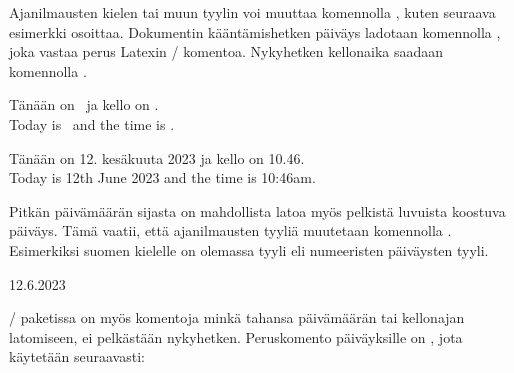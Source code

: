 \begin{koodilohkosis}
\usepackage[finnish, en-GB, showseconds=false]{datetime2}
\end{koodilohkosis}

\noindent
Ajanilmausten kielen tai muun tyylin voi muuttaa komennolla
, kuten seuraava esimerkki osoittaa. Dokumentin
kääntämishetken päiväys ladotaan komennolla , joka
vastaa perus Latexin \-/ komentoa. Nykyhetken kellonaika
saadaan komennolla .

\begin{koodilohkosis}
Tänään on \DTMtoday\ ja kello on \DTMcurrenttime. \\
Today is \DTMtoday\ and the time is \DTMcurrenttime.
\end{koodilohkosis}

\begin{tulossis}
  Tänään on 12. kesäkuuta 2023 ja kello on 10.46. \\
  Today is 12th June 2023 and the time is 10:46am.
\end{tulossis}

\noindent
Pitkän päivämäärän sijasta on mahdollista latoa myös pelkistä luvuista
koostuva päiväys. Tämä vaatii, että ajanilmausten tyyliä muutetaan
komennolla . Esimerkiksi suomen kielelle on
olemassa tyyli  eli numeeristen päiväysten tyyli.

\begin{koodilohkosis}
\DTMtoday
\end{koodilohkosis}

\begin{tulossis}
  12.6.2023
\end{tulossis}

\noindent
{}\-/ paketissa on myös komentoja minkä tahansa
päivämäärän tai kellonajan latomiseen, ei pelkästään nykyhetken.
Peruskomento päiväyksille on , jota käytetään
seuraavasti:

\begin{koodilohkosis}
\end{koodilohkosis}

